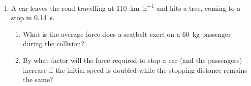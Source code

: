 \begin{enumerate}[itemsep=6pt]

\item A car leaves the road travelling at \SI{110}{\kilo\metre\per\hour} and
  hits a tree, coming to a stop in \SI{.14}\second.
  \begin{enumerate}[itemsep=3pt]
  \item What is the average force does a seatbelt exert on a
    \SI{60}{\kilo\gram} passenger during the collision?
  \item By what factor will the force required to stop a car (and the
    passengers) increase if the initial speed is doubled while the stopping
    distance remains the same?
  \end{enumerate}


\end{enumerate}
